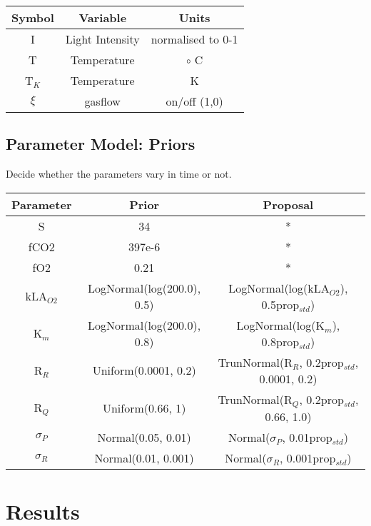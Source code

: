 \documentclass{ruthesis}
\begin{document}
\begin{tabular}{c c  | c}
	 \hline
	 Symbol & Variable & Units  \\ \hline
	I &  Light Intensity  &  normalised to 0-1   \\
	T & Temperature & $\circ$ C  \\
	T$_K$ & Temperature &  K  \\
	$\xi$ & gasflow &  on/off (1,0)  \\
	
\end{tabular}


\subsection{Parameter Model: Priors}
Decide whether the parameters vary in time or not.




\begin{tabular}{c | c  |  c}
	Parameter & Prior &  Proposal \\ \hline
	S  & 34 & * \\
	fCO2  & 397e-6 &  *  \\
	fO2  & 0.21 &  *  \\
	kLA$_{O2}$  & LogNormal(log(200.0), 0.5)  & LogNormal(log(kLA$_{O2}$), 0.5prop$_{std}$) \\
	K$_m$ &  LogNormal(log(200.0), 0.8)  & LogNormal(log(K$_m$), 0.8prop$_{std}$) \\
	R$_R$  & Uniform(0.0001, 0.2) &  TrunNormal(R$_R$, 0.2prop$_{std}$, 0.0001, 0.2) \\
	R$_Q$  & Uniform(0.66, 1) &  TrunNormal(R$_Q$, 0.2prop$_{std}$, 0.66, 1.0)
	 \\
	$\sigma_P$ & Normal(0.05, 0.01) & Normal($\sigma_P$, 0.01prop$_{std}$) \\
	$\sigma_R$ & Normal(0.01, 0.001) & Normal($\sigma_R$, 0.001prop$_{std}$) \\
	
\end{tabular}
\newpage



\section{Results}
\end{document}
